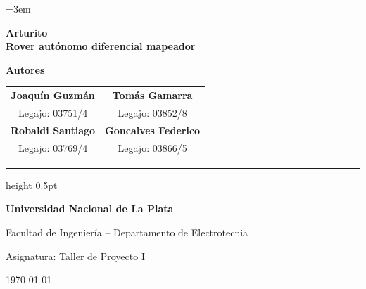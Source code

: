 \documentclass[12pt,a4paper]{article}
\begin{document}

\emergencystretch=3em

\begin{titlepage}
    \thispagestyle{empty}
    \centering

    \vspace*{1.5cm}

   {\huge \bfseries Arturito\\[0.3em] Rover autónomo diferencial mapeador \par}

    \vfill %

    {\Large \bfseries Autores \par}
    \vspace{0.6cm}
    \begin{tabular}{c c}
        \textbf{Joaquín Guzmán} & \textbf{Tomás Gamarra} \\
        \small Legajo: 03751/4 & \small Legajo: 03852/8 \\[1.5em]
        \textbf{Robaldi Santiago} & \textbf{Goncalves Federico} \\
        \small Legajo: 03769/4 & \small Legajo: 03866/5
    \end{tabular}

    \vspace{1.5cm}

    \hrule height 0.5pt %
    \vspace{0.4cm}

    {\large \textbf{Universidad Nacional de La Plata}} \par
    \vspace{0.15cm}
    {Facultad de Ingeniería -- Departamento de Electrotecnia} \par
    \vspace{0.15cm}
    {\small Asignatura: Taller de Proyecto I} \par
    \vspace{0.3cm}
    {\small \today}

\end{titlepage}
\end{document}
